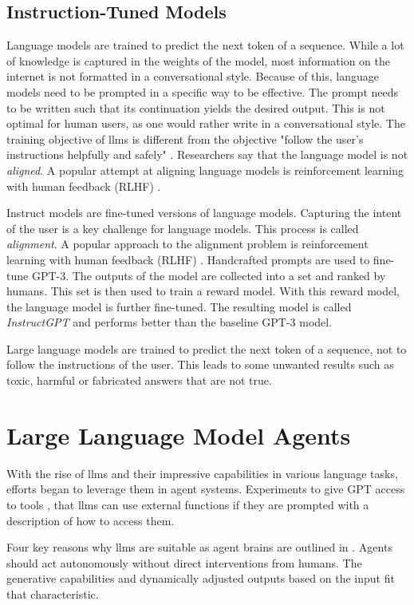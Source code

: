 \documentclass[../main.tex]{subfiles}
\begin{document}
\subsection{Instruction-Tuned Models}

Language models are trained to predict the next token of a sequence.
While a lot of knowledge is captured in the weights of the model,
most information on the internet is not formatted in a conversational style.
Because of this, language models need to be prompted in a specific way to be effective.
The prompt needs to be written such that its continuation yields the desired output.
This is not optimal for human users, as one would rather write in a conversational style.
The training objective of \glspl{llm} is different from the objective
"follow the user's instructions helpfully and safely" \cite{Ouyang2022}.
Researchers say that the language model is not \emph{aligned}.
A popular attempt at aligning language models is reinforcement learning with human feedback (RLHF) \cite{Ouyang2022}.


Instruct models are fine-tuned versions of language models.
Capturing the intent of the user is a key challenge for language models.
This process is called \emph{alignment}.
A popular approach to the alignment problem is reinforcement learning with human feedback (RLHF) \cite{Ouyang2022}.
Handcrafted prompts are used to fine-tune GPT-3.
The outputs of the model are collected into a set and ranked by humans.
This set is then used to train a reward model.
With this reward model, the language model is further fine-tuned.
The resulting model is called \emph{InstructGPT} and performs better than the baseline GPT-3 model.

Large language models are trained to predict the next token of a sequence,
not to follow the instructions of the user.
This leads to some unwanted results such as toxic, harmful or fabricated answers that are not true.

\section{Large Language Model Agents}
\label{sec:llm_agents}
With the rise of \glspl{llm} and their impressive capabilities in various language tasks,
efforts began to leverage them in agent systems.
Experiments to give GPT access to tools \autocite{Shen2023, Schick2023},
that \glspl{llm} can use external functions
if they are prompted with a description of how to access them.

Four key reasons why \glspl{llm} are suitable as agent brains are outlined in \cite{Xi2023}.
Agents should act autonomously without direct interventions from humans.
The generative capabilities and dynamically adjusted outputs based on the input fit that characteristic.
\end{document}
